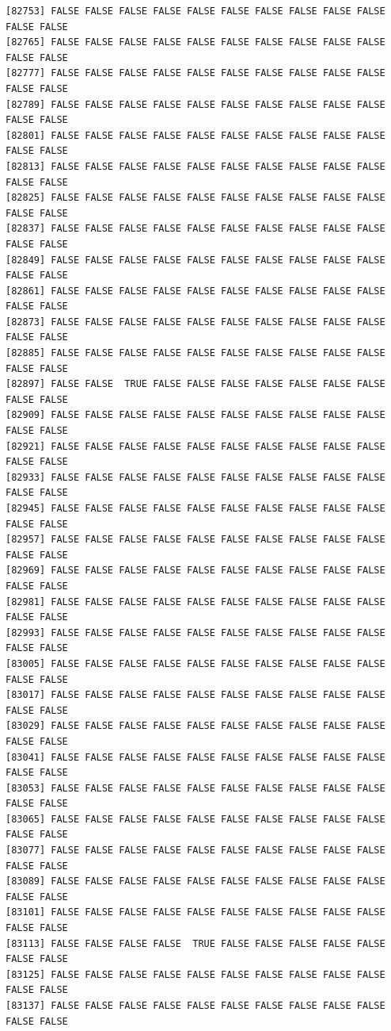 \documentclass[
  a4paper,
  DIV=11,
  numbers=noendperiod]{scrartcl}
\begin{document}
\begin{verbatim}
[82753] FALSE FALSE FALSE FALSE FALSE FALSE FALSE FALSE FALSE FALSE FALSE FALSE
[82765] FALSE FALSE FALSE FALSE FALSE FALSE FALSE FALSE FALSE FALSE FALSE FALSE
[82777] FALSE FALSE FALSE FALSE FALSE FALSE FALSE FALSE FALSE FALSE FALSE FALSE
[82789] FALSE FALSE FALSE FALSE FALSE FALSE FALSE FALSE FALSE FALSE FALSE FALSE
[82801] FALSE FALSE FALSE FALSE FALSE FALSE FALSE FALSE FALSE FALSE FALSE FALSE
[82813] FALSE FALSE FALSE FALSE FALSE FALSE FALSE FALSE FALSE FALSE FALSE FALSE
[82825] FALSE FALSE FALSE FALSE FALSE FALSE FALSE FALSE FALSE FALSE FALSE FALSE
[82837] FALSE FALSE FALSE FALSE FALSE FALSE FALSE FALSE FALSE FALSE FALSE FALSE
[82849] FALSE FALSE FALSE FALSE FALSE FALSE FALSE FALSE FALSE FALSE FALSE FALSE
[82861] FALSE FALSE FALSE FALSE FALSE FALSE FALSE FALSE FALSE FALSE FALSE FALSE
[82873] FALSE FALSE FALSE FALSE FALSE FALSE FALSE FALSE FALSE FALSE FALSE FALSE
[82885] FALSE FALSE FALSE FALSE FALSE FALSE FALSE FALSE FALSE FALSE FALSE FALSE
[82897] FALSE FALSE  TRUE FALSE FALSE FALSE FALSE FALSE FALSE FALSE FALSE FALSE
[82909] FALSE FALSE FALSE FALSE FALSE FALSE FALSE FALSE FALSE FALSE FALSE FALSE
[82921] FALSE FALSE FALSE FALSE FALSE FALSE FALSE FALSE FALSE FALSE FALSE FALSE
[82933] FALSE FALSE FALSE FALSE FALSE FALSE FALSE FALSE FALSE FALSE FALSE FALSE
[82945] FALSE FALSE FALSE FALSE FALSE FALSE FALSE FALSE FALSE FALSE FALSE FALSE
[82957] FALSE FALSE FALSE FALSE FALSE FALSE FALSE FALSE FALSE FALSE FALSE FALSE
[82969] FALSE FALSE FALSE FALSE FALSE FALSE FALSE FALSE FALSE FALSE FALSE FALSE
[82981] FALSE FALSE FALSE FALSE FALSE FALSE FALSE FALSE FALSE FALSE FALSE FALSE
[82993] FALSE FALSE FALSE FALSE FALSE FALSE FALSE FALSE FALSE FALSE FALSE FALSE
[83005] FALSE FALSE FALSE FALSE FALSE FALSE FALSE FALSE FALSE FALSE FALSE FALSE
[83017] FALSE FALSE FALSE FALSE FALSE FALSE FALSE FALSE FALSE FALSE FALSE FALSE
[83029] FALSE FALSE FALSE FALSE FALSE FALSE FALSE FALSE FALSE FALSE FALSE FALSE
[83041] FALSE FALSE FALSE FALSE FALSE FALSE FALSE FALSE FALSE FALSE FALSE FALSE
[83053] FALSE FALSE FALSE FALSE FALSE FALSE FALSE FALSE FALSE FALSE FALSE FALSE
[83065] FALSE FALSE FALSE FALSE FALSE FALSE FALSE FALSE FALSE FALSE FALSE FALSE
[83077] FALSE FALSE FALSE FALSE FALSE FALSE FALSE FALSE FALSE FALSE FALSE FALSE
[83089] FALSE FALSE FALSE FALSE FALSE FALSE FALSE FALSE FALSE FALSE FALSE FALSE
[83101] FALSE FALSE FALSE FALSE FALSE FALSE FALSE FALSE FALSE FALSE FALSE FALSE
[83113] FALSE FALSE FALSE FALSE  TRUE FALSE FALSE FALSE FALSE FALSE FALSE FALSE
[83125] FALSE FALSE FALSE FALSE FALSE FALSE FALSE FALSE FALSE FALSE FALSE FALSE
[83137] FALSE FALSE FALSE FALSE FALSE FALSE FALSE FALSE FALSE FALSE FALSE FALSE

\end{verbatim}
\end{document}
